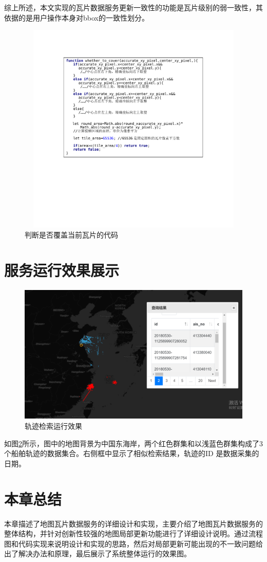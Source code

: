 综上所述，本文实现的瓦片数据服务更新一致性的功能是瓦片级别的弱一致性，其依据的是用户操作本身对bbox的一致性划分。

\begin{figure}[H]
  \centering
  \includegraphics[width=6in,height=4in]{new_FIGs/chapter4/consistancy-code.pdf}
  \caption{判断是否覆盖当前瓦片的代码}\label{consistancy-code}
\end{figure}

\section{服务运行效果展示}
\begin{figure}[H]
  \centering
  \includegraphics[width=6in]{new_FIGs/chapter5/running.pdf}
  \caption{轨迹检索运行效果}\label{running}
\end{figure}
如图\ref{running}所示，图中的地图背景为中国东海岸，两个红色群集和以浅蓝色群集构成了3个船舶轨迹的数据集合。右侧框中显示了相似检索结果，轨迹的ID 是数据采集的日期。
\section{本章总结}
本章描述了地图瓦片数据服务的详细设计和实现，主要介绍了地图瓦片数据服务的整体结构，并针对创新性较强的地图局部更新功能进行了详细设计说明。通过流程图和代码实现来说明设计和实现的思路，然后对局部更新可能出现的不一致问题给出了解决办法和原理，最后展示了系统整体运行的效果图。
